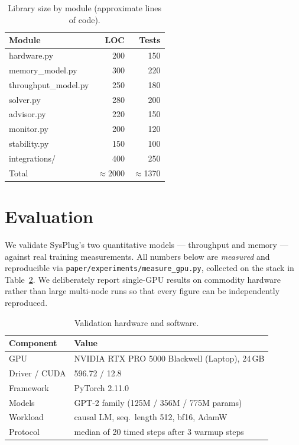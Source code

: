\documentclass[10pt,twocolumn]{article}
\begin{document}
\begin{table}[h]
\centering
\caption{Library size by module (approximate lines of code).}
\label{tab:loc}
\begin{tabular}{lrr}
\toprule
Module & LOC & Tests \\
\midrule
hardware.py & 200 & 150 \\
memory\_model.py & 300 & 220 \\
throughput\_model.py & 250 & 180 \\
solver.py & 280 & 200 \\
advisor.py & 220 & 150 \\
monitor.py & 200 & 120 \\
stability.py & 150 & 100 \\
integrations/ & 400 & 250 \\
\midrule
Total & $\approx$2000 & $\approx$1370 \\
\bottomrule
\end{tabular}
\end{table}

\section{Evaluation}

We validate SysPlug's two quantitative models --- throughput and memory ---
against real training measurements. All numbers below are \emph{measured} and
reproducible via \texttt{paper/experiments/measure\_gpu.py}, collected on the
stack in Table~\ref{tab:setup}. We deliberately report single-GPU results on
commodity hardware rather than large multi-node runs so that every figure can
be independently reproduced.

\begin{table}[h]
\centering
\caption{Validation hardware and software.}
\label{tab:setup}
\begin{tabular}{ll}
\toprule
Component & Value \\
\midrule
GPU & NVIDIA RTX PRO 5000 Blackwell (Laptop), 24\,GB \\
Driver / CUDA & 596.72 / 12.8 \\
Framework & PyTorch 2.11.0 \\
Models & GPT-2 family (125M / 356M / 775M params) \\
Workload & causal LM, seq.\ length 512, bf16, AdamW \\
Protocol & median of 20 timed steps after 3 warmup steps \\
\bottomrule
\end{tabular}
\end{table}
\end{document}
